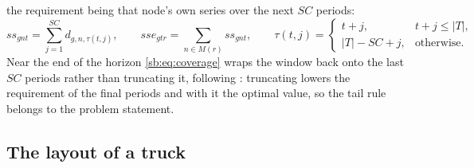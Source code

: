 the requirement being that node's own series over the next $SC$
periods:
\begin{equation}
ss_{gnt}=\sum_{j=1}^{SC} d_{g,n,\tau(t,j)},
\qquad
sse_{gtr}=\sum_{n\in M(r)} ss_{gnt},
\qquad
\tau(t,j)=\begin{cases} t+j, & t+j\le |T|,\\ |T|-SC+j, & \text{otherwise.}\end{cases}
\label{sb:eq:coverage}
\end{equation}
Near the end of the horizon \eqref{sb:eq:coverage} wraps the window
back onto the last $SC$ periods rather than truncating it, following
\autocite{Diaz-Madronero2014APlanning}: truncating lowers the
requirement of the final periods and with it the optimal value, so the
tail rule belongs to the problem statement.

\subsection{The layout of a truck}

